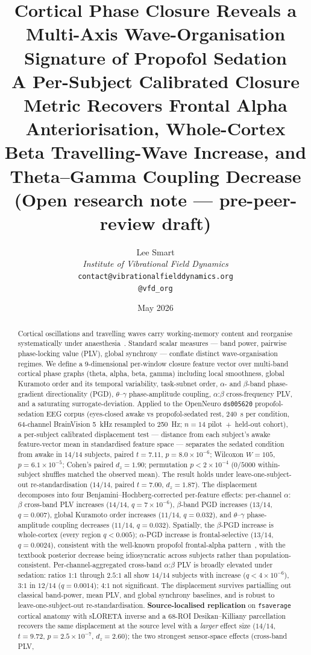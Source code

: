 \documentclass[11pt,a4paper]{article}
\title{\textbf{Cortical Phase Closure Reveals a Multi-Axis Wave-Organisation Signature of Propofol Sedation}\\[2pt]
\large A Per-Subject Calibrated Closure Metric Recovers Frontal Alpha Anteriorisation, Whole-Cortex Beta Travelling-Wave Increase, and Theta--Gamma Coupling Decrease\\[1pt]
\small (Open research note --- pre-peer-review draft)}
\author{%
  Lee Smart\\[4pt]
  \textit{Institute of Vibrational Field Dynamics}\\[2pt]
  \texttt{contact@vibrationalfielddynamics.org}\\[2pt]
  \texttt{@vfd\_org}%
}
\date{May 2026}
\begin{document}
\maketitle
\thispagestyle{empty}

\begin{abstract}
\noindent
Cortical oscillations and travelling waves carry working-memory content and reorganise systematically under anaesthesia~\cite{lundqvist2016gamma,davis2020spontaneous,stoll2025convergent}. Standard scalar measures --- band power, pairwise phase-locking value (PLV), global synchrony --- conflate distinct wave-organisation regimes. We define a $9$-dimensional per-window closure feature vector over multi-band cortical phase graphs (theta, alpha, beta, gamma) including local smoothness, global Kuramoto order and its temporal variability, task-subnet order, $\alpha$- and $\beta$-band phase-gradient directionality (PGD), $\theta$--$\gamma$ phase-amplitude coupling, $\alpha$:$\beta$ cross-frequency PLV, and a saturating surrogate-deviation. Applied to the OpenNeuro \texttt{ds005620} propofol-sedation EEG corpus (eyes-closed awake vs propofol-sedated rest, \SI{240}{\second} per condition, \num{64}-channel BrainVision \SI{5}{\kilo\hertz} resampled to \SI{250}{\hertz}; $n=14$ pilot~$+$~held-out cohort), a per-subject calibrated displacement test --- distance from each subject's awake feature-vector mean in standardised feature space --- separates the sedated condition from awake in $14/14$ subjects, paired $t=7.11$, $p=8.0\!\times\!10^{-6}$; Wilcoxon $W=105$, $p=6.1\!\times\!10^{-5}$; Cohen's paired $d_z=1.90$; permutation $p<2\!\times\!10^{-4}$ ($0/5000$ within-subject shuffles matched the observed mean). The result holds under leave-one-subject-out re-standardisation ($14/14$, paired $t=7.00$, $d_z=1.87$). The displacement decomposes into four Benjamini--Hochberg-corrected per-feature effects: per-channel $\alpha$:$\beta$ cross-band PLV increases ($14/14$, $q=7\!\times\!10^{-6}$), $\beta$-band PGD increases ($13/14$, $q=0.007$), global Kuramoto order increases ($11/14$, $q=0.032$), and $\theta$--$\gamma$ phase-amplitude coupling decreases ($11/14$, $q=0.032$). Spatially, the $\beta$-PGD increase is whole-cortex (every region $q<0.005$); $\alpha$-PGD increase is frontal-selective ($13/14$, $q=0.0024$), consistent with the well-known propofol frontal-alpha pattern~\cite{purdon2013electroencephalogram,ching2010thalamocortical}, with the textbook posterior decrease being idiosyncratic across subjects rather than population-consistent. Per-channel-aggregated cross-band $\alpha$:$\beta$ PLV is broadly elevated under sedation: ratios $1$:$1$ through $2.5$:$1$ all show $14/14$ subjects with increase ($q<4\!\times\!10^{-6}$), $3$:$1$ in $12/14$ ($q=0.0014$); $4$:$1$ not significant. The displacement survives partialling out classical band-power, mean PLV, and global synchrony baselines, and is robust to leave-one-subject-out re-standardisation. \textbf{Source-localised replication} on \texttt{fsaverage} cortical anatomy with sLORETA inverse and a $68$-ROI Desikan--Killiany parcellation recovers the same displacement at the source level with a \emph{larger} effect size ($14/14$, $t=9.72$, $p=2.5\!\times\!10^{-7}$, $d_z=2.60$); the two strongest sensor-space effects (cross-band PLV, 
\end{abstract}
\end{document}
